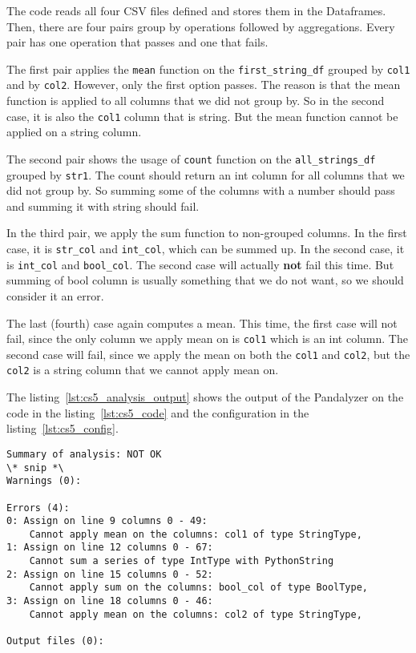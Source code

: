 The code reads all four CSV files defined and stores them in the Dataframes.
Then, there are four pairs group by operations followed by aggregations.
Every pair has one operation that passes and one that fails.

The first pair applies the \verb|mean| function on the \verb|first_string_df| grouped by \verb|col1| and by \verb|col2|.
However, only the first option passes.
The reason is that the mean function is applied to all columns that we did not group by.
So in the second case, it is also the \verb|col1| column that is string.
But the mean function cannot be applied on a string column.

The second pair shows the usage of \verb|count| function on the \verb|all_strings_df| grouped by \verb|str1|.
The count should return an int column for all columns that we did not group by.
So summing some of the columns with a number should pass and summing it with string should fail.

In the third pair, we apply the sum function to non-grouped columns.
In the first case, it is \verb|str_col| and \verb|int_col|, which can be summed up.
In the second case, it is \verb|int_col| and \verb|bool_col|.
The second case will actually \textbf{not} fail this time.
But summing of bool column is usually something that we do not want, so we should consider it an error.

The last (fourth) case again computes a mean.
This time, the first case will not fail, since the only column we apply mean on is \verb|col1| which is an int column.
The second case will fail, since we apply the mean on both the \verb|col1| and \verb|col2|, but the \verb|col2| is
a string column that we cannot apply mean on.

The listing~\ref{lst:cs5_analysis_output} shows the output of the Pandalyzer on the code in the listing~\ref{lst:cs5_code}
and the configuration in the listing~\ref{lst:cs5_config}.

\begin{lstlisting}[caption=Analysis output of the fifth case study, label={lst:cs5_analysis_output}, captionpos=b]
Summary of analysis: NOT OK
\* snip *\
Warnings (0):

Errors (4):
0: Assign on line 9 columns 0 - 49:
    Cannot apply mean on the columns: col1 of type StringType,
1: Assign on line 12 columns 0 - 67:
    Cannot sum a series of type IntType with PythonString
2: Assign on line 15 columns 0 - 52:
    Cannot apply sum on the columns: bool_col of type BoolType,
3: Assign on line 18 columns 0 - 46:
    Cannot apply mean on the columns: col2 of type StringType,

Output files (0):
\end{lstlisting}

